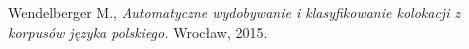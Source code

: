 \begin{thebibliography}{9}

Wendelberger M., 
\textit{Automatyczne wydobywanie i klasyfikowanie
kolokacji z korpusów języka polskiego.} 
Wrocław, 2015.



\end{thebibliography}